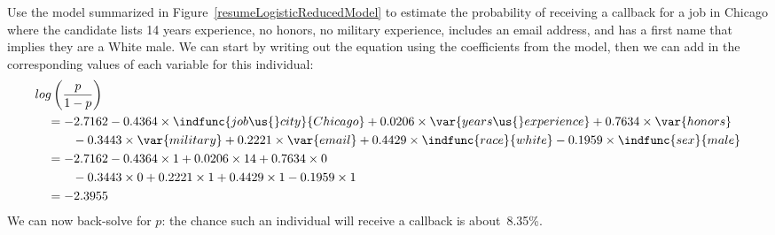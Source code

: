 \begin{examplewrap}
\begin{nexample}{Use the model summarized in
    Figure~\ref{resumeLogisticReducedModel}
    to estimate the probability
    of receiving a callback for a job in Chicago
    where the candidate lists 14 years experience,
    no honors,
    no military experience,
    includes an email address,
    and has a first name that implies they are a White male.}
  \label{exampleForResumeAndWhiteQuantified}%
  We can start by writing out the equation using the
  coefficients from the model, then we can
  add in the corresponding values of each variable for this
  individual:
  \begin{align*}
  &log\left(\frac{p}{1 - p}\right) \\
    &\quad= - 2.7162
        - 0.4364 \times \indfunc{job\us{}city}{Chicago}
        + 0.0206 \times \var{years\us{}experience}
        + 0.7634 \times \var{honors} \\
      &\quad\qquad
          - 0.3443 \times \var{military}
          + 0.2221 \times \var{email}
          + 0.4429 \times \indfunc{race}{white}
          - 0.1959 \times \indfunc{sex}{male} \\
    &\quad= - 2.7162
        - 0.4364 \times 1
        + 0.0206 \times 14
        + 0.7634 \times 0 \\
      &\quad\qquad
          - 0.3443 \times 0
          + 0.2221 \times 1
          + 0.4429 \times 1
          - 0.1959 \times 1 \\
    &\quad= - 2.3955
  \end{align*}
  We can now back-solve for $p$:
  the chance such an individual will receive
  a callback is about~8.35\%.
\end{nexample}
\end{examplewrap}

